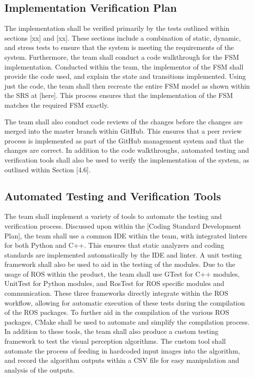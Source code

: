 \documentclass[12pt, titlepage]{article}
\begin{document}
\subsection{Implementation Verification Plan}

The implementation shall be verified primarily by the tests outlined within sections [xx] and [xx]. These sections include a combination of static, dynamic, and stress tests to ensure that the system is meeting the requirements of the system. Furthermore, the team shall conduct a code walkthrough for the FSM implementation. Conducted within the team, the implementor of the FSM shall provide the code used, and explain the state and transitions implemented. Using just the code, the team shall then recreate the entire FSM model as shown within the SRS at [here]. This process ensures that the implementation of the FSM matches the required FSM exactly.  

The team shall also conduct code reviews of the changes before the changes are merged into the master branch within GitHub. This ensures that a peer review process is implemented as part of the GitHub management system and that the changes are correct. In addition to the code walkthroughs, automated testing and verification tools shall also be used to verify the implementation of the system, as outlined within Section [4.6]. 


\subsection{Automated Testing and Verification Tools}

The team shall implement a variety of tools to automate the testing and verification process. Discussed upon within the [Coding Standard Development Plan], the team shall use a common IDE within the team, with integrated linters for both Python and C++. This ensures that static analyzers and coding standards are implemented automatically by the IDE and linter. A unit testing framework shall also be used to aid in the testing of the modules. Due to the usage of ROS within the product, the team shall use GTest for C++ modules, UnitTest for Python modules, and RosTest for ROS specific modules and communication. These three frameworks directly integrate within the ROS workflow, allowing for automatic execution of these tests during the compilation of the ROS packages. To further aid in the compilation of the various ROS packages, CMake shall be used to automate and simplify the compilation process. In addition to these tools, the team shall also produce a custom testing framework to test the visual perception algorithms. The custom tool shall automate the process of feeding in hardcoded input images into the algorithm, and record the algorithm outputs within a CSV file for easy manipulation and analysis of the outputs. 
\end{document}
